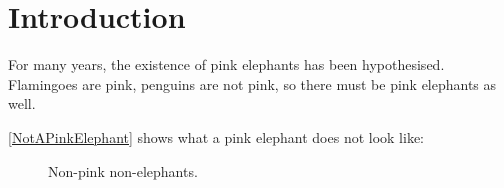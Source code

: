 \section{Introduction}
\label{sec:Introduction}

For many years, the existence of pink elephants has been hypothesised. Flamingoes are pink, penguins are not pink, so there must be pink elephants as well.

\autoref{NotAPinkElephant} shows what a pink elephant does not look like:
\begin{figure}[h]
\begin{center}
	\caption{Non-pink non-elephants.}
	\label{NotAPinkElephant}
\end{center}
\end{figure} 
